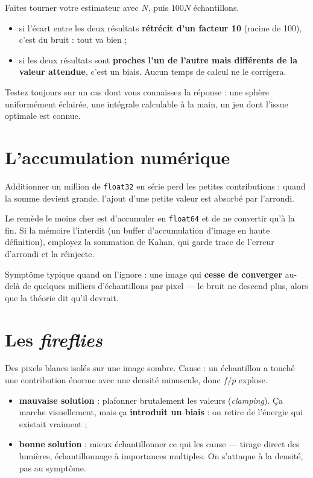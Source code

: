 \begin{nkretenir}
Faites tourner votre estimateur avec $N$, puis $100N$ échantillons.

\begin{itemize}
  \item si l'écart entre les deux résultats \textbf{rétrécit d'un facteur 10}
        (racine de 100), c'est du bruit : tout va bien ;
  \item si les deux résultats sont \textbf{proches l'un de l'autre mais
        différents de la valeur attendue}, c'est un biais. Aucun temps de
        calcul ne le corrigera.
\end{itemize}
Testez toujours sur un cas dont vous connaissez la réponse : une sphère
uniformément éclairée, une intégrale calculable à la main, un jeu dont l'issue
optimale est connue.
\end{nkretenir}

\section{L'accumulation numérique}

Additionner un million de \texttt{float32} en série perd les petites
contributions : quand la somme devient grande, l'ajout d'une petite valeur est
absorbé par l'arrondi.

\begin{nkpiege}
Le remède le moins cher est d'accumuler en \texttt{float64} et de ne convertir
qu'à la fin. Si la mémoire l'interdit (un buffer d'accumulation d'image en
haute définition), employez la sommation de Kahan, qui garde trace de l'erreur
d'arrondi et la réinjecte.

Symptôme typique quand on l'ignore : une image qui \textbf{cesse de converger}
au-delà de quelques milliers d'échantillons par pixel — le bruit ne descend
plus, alors que la théorie dit qu'il devrait.
\end{nkpiege}

\section{Les \emph{fireflies}}

Des pixels blancs isolés sur une image sombre. Cause : un échantillon a touché
une contribution énorme avec une densité minuscule, donc $f/p$ explose.

\begin{itemize}
  \item \textbf{mauvaise solution} : plafonner brutalement les valeurs
        (\emph{clamping}). Ça marche visuellement, mais ça \textbf{introduit un
        biais} : on retire de l'énergie qui existait vraiment ;
  \item \textbf{bonne solution} : mieux échantillonner ce qui les cause —
        tirage direct des lumières, échantillonnage à importances multiples.
        On s'attaque à la densité, pas au symptôme.
\end{itemize}

